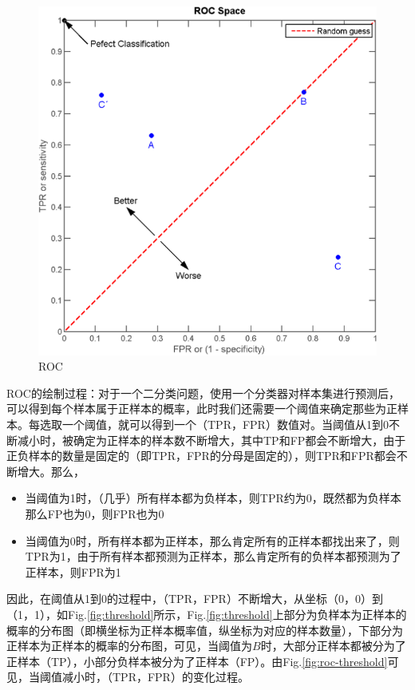 \begin{figure}[h]
	\centering
	\includegraphics[width=.6\textwidth]{pics/roc.png}
	\caption{ROC}
	\label{fig:roc}
\end{figure}
ROC的绘制过程：对于一个二分类问题，使用一个分类器对样本集进行预测后，可以得到每个样本属于正样本的概率，此时我们还需要一个阈值来确定那些为正样本。每选取一个阈值，就可以得到一个（TPR，FPR）数值对。当阈值从1到0不断减小时，被确定为正样本的样本数不断增大，其中TP和FP都会不断增大，由于正负样本的数量是固定的（即TPR，FPR的分母是固定的），则TPR和FPR都会不断增大。那么，
\begin{itemize}
	\item 当阈值为1时，（几乎）所有样本都为负样本，则TPR约为0，既然都为负样本那么FP也为0，则FPR也为0
	\item 当阈值为0时，所有样本都为正样本，那么肯定所有的正样本都找出来了，则TPR为1，由于所有样本都预测为正样本，那么肯定所有的负样本都预测为了正样本，则FPR为1
\end{itemize}
因此，在阈值从1到0的过程中，（TPR，FPR）不断增大，从坐标（0，0）到（1，1），如Fig.\ref{fig:threshold}所示，Fig.\ref{fig:threshold}上部分为负样本为正样本的概率的分布图（即横坐标为正样本概率值，纵坐标为对应的样本数量），下部分为正样本为正样本的概率的分布图，可见，当阈值为$B$时，大部分正样本都被分为了正样本（TP），小部分负样本被分为了正样本（FP）。由Fig.\ref{fig:roc-threshold}可见，当阈值减小时，（TPR，FPR）的变化过程。

